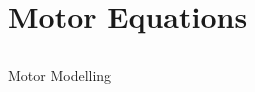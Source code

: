 \section{Motor Equations}

%
%
%
%
%
%
%


\subsection{}
{
\begin{frame}{Motor Modelling}

	\vspace{-3mm}
   	\begin{figure}
 	\end{figure}



\end{frame}
}




